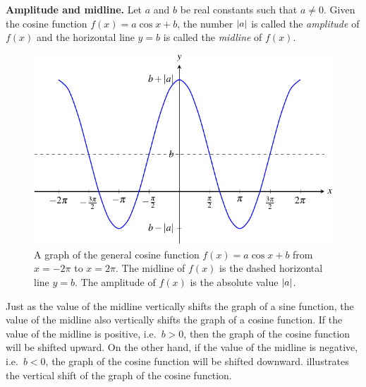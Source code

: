 \documentclass[a4paper,oneside,12pt]{article}
\begin{document}
\begin{definition}
\label{def:trigonometric:cosine_amplitude_and_midline}
\textbf{Amplitude and midline.}
Let $a$ and $b$ be real constants such that $a \neq 0$.  Given the
cosine function $f(x) = a \cos x + b$, the number $\lvert a\rvert$
is called the \emph{amplitude} of $f(x)$ and the horizontal line $y =
b$ is called the \emph{midline} of $f(x)$.
\end{definition}

\begin{figure}[!htbp]
\centering
\includegraphics[scale=1.1]{image/13/a-cos-b.pdf}
\caption{%
  A graph of the general cosine function $f(x) = a \cos x + b$ from
  $x = -2\pi$ to $x = 2\pi$.  The midline of $f(x)$ is the dashed
  horizontal line $y = b$.  The amplitude of $f(x)$ is the absolute
  value $\lvert a\rvert$.
}
\label{fig:trigonometric:a_cos_b}
\end{figure}

Just as the value of the midline vertically shifts the graph of a sine
function, the value of the midline also vertically shifts the graph of
a cosine function.  If the value of the midline is positive,
i.e.~$b > 0$, then the graph of the cosine function will be shifted
upward.  On the other hand, if the value of the midline is negative,
i.e.~$b < 0$, the graph of the cosine function will be shifted
downward.   illustrates
the vertical shift of the graph of the cosine function.
\end{document}
